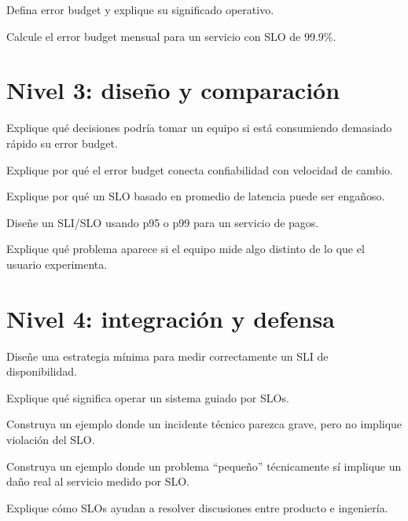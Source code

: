 \documentclass[variant=guia,cover=institutional,mode=screen]{ua-engineering-v6-article}
\begin{document}
\begin{uaexercise}
Defina error budget y explique su significado operativo.
\end{uaexercise}

\begin{uaexercise}
Calcule el error budget mensual para un servicio con SLO de 99.9\%.
\end{uaexercise}


\section{Nivel 3: diseño y comparación}
\begin{uaexercise}
Explique qué decisiones podría tomar un equipo si está consumiendo demasiado rápido su error budget.
\end{uaexercise}

\begin{uaexercise}
Explique por qué el error budget conecta confiabilidad con velocidad de cambio.
\end{uaexercise}

\begin{uaexercise}
Explique por qué un SLO basado en promedio de latencia puede ser engañoso.
\end{uaexercise}

\begin{uaexercise}
Diseñe un SLI/SLO usando p95 o p99 para un servicio de pagos.
\end{uaexercise}

\begin{uaexercise}
Explique qué problema aparece si el equipo mide algo distinto de lo que el usuario experimenta.
\end{uaexercise}


\section{Nivel 4: integración y defensa}
\begin{uaexercise}
Diseñe una estrategia mínima para medir correctamente un SLI de disponibilidad.
\end{uaexercise}

\begin{uaexercise}
Explique qué significa operar un sistema guiado por SLOs.
\end{uaexercise}

\begin{uaexercise}
Construya un ejemplo donde un incidente técnico parezca grave, pero no implique violación del SLO.
\end{uaexercise}

\begin{uaexercise}
Construya un ejemplo donde un problema “pequeño” técnicamente sí implique un daño real al servicio medido por SLO.
\end{uaexercise}

\begin{uaexercise}
Explique cómo SLOs ayudan a resolver discusiones entre producto e ingeniería.
\end{uaexercise}
\end{document}
